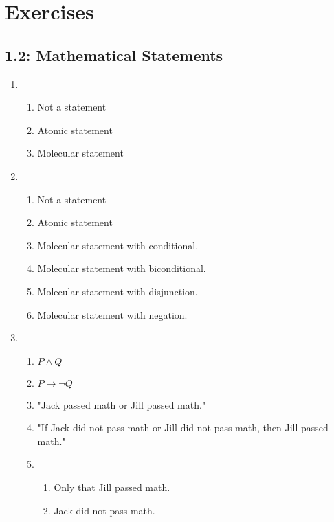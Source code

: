 \section{Exercises}
\subsection{1.2: Mathematical Statements}
    \begin{enumerate}
        \item 
            \begin{enumerate}
                \item Not a statement
                \item Atomic statement
                \item Molecular statement
            \end{enumerate}
        \item
            \begin{enumerate}
                \item Not a statement
                \item Atomic statement
                \item Molecular statement with conditional.
                \item Molecular statement with biconditional.
                \item Molecular statement with disjunction.
                \item Molecular statement with negation.
            \end{enumerate}
        \item
            \begin{enumerate}
                \item $P \wedge Q$
                \item $P \rightarrow \neg Q$
                \item "Jack passed math or Jill passed math."
                \item "If Jack did not pass math or Jill did not pass math, then Jill passed math."
                \item 
                    \begin{enumerate}
                        \item Only that Jill passed math.
                        \item Jack did not pass math.
                    \end{enumerate}
            \end{enumerate}

\end{enumerate}

